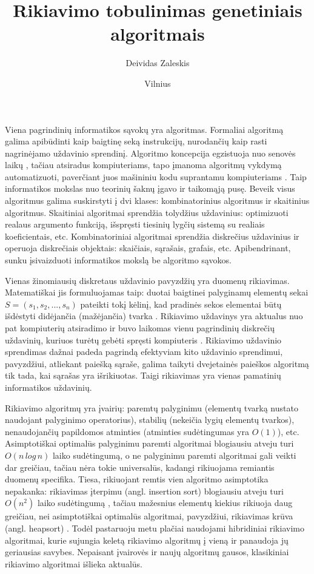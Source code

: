\documentclass{VUMIFInfKursinis}
\institute{Informatikos institutas}  %
\title{Rikiavimo tobulinimas genetiniais algoritmais}
\author{Deividas Zaleskis}
\date{Vilnius \\ \the\year}
\begin{document}
\maketitle

\tableofcontents


Viena pagrindinių informatikos sąvokų yra algoritmas.
Formaliai algoritmą galima apibūdinti kaip
baigtinę seką instrukcijų, nurodančių kaip rasti nagrinėjamo uždavinio sprendinį.
Algoritmo koncepcija egzistuoja nuo senovės laikų \cite{knuth1972ancient}, tačiau atsiradus kompiuteriams,
tapo įmanoma algoritmų vykdymą automatizuoti, paverčiant juos mašininiu kodu suprantamu kompiuteriams \cite{wilkes1951preparation}.
Taip informatikos mokslas nuo teorinių šaknų \cite{turing1937computable} įgavo ir taikomąją pusę.
Beveik visus algoritmus galima suskirstyti į dvi klases: kombinatorinius algoritmus ir skaitinius algoritmus.
Skaitiniai algoritmai sprendžia tolydžius uždavinius: optimizuoti realaus argumento funkciją, išspręsti tiesinių lygčių sistemą su realiais koeficientais, etc.
Kombinatoriniai algoritmai sprendžia diskrečius uždavinius ir operuoja diskrečiais objektais: skaičiais, sąrašais, grafais, etc.
Apibendrinant, sunku įsivaizduoti informatikos mokslą be algoritmo sąvokos.

Vienas žinomiausių diskretaus uždavinio pavyzdžių yra duomenų rikiavimas.
Matematiškai jis formuluojamas taip:
duotai baigtinei palyginamų elementų sekai $S = (s_1, s_2, ..., s_n)$ pateikti tokį
kėlinį, kad pradinės sekos elementai būtų išdėstyti didėjančia (mažėjančia) tvarka \cite{Radavičius_Baranauskas_2013}.
Rikiavimo uždavinys yra aktualus nuo pat kompiuterių atsiradimo ir buvo laikomas vienu 
pagrindinių diskrečių uždavinių, kuriuos turėtų gebėti spręsti kompiuteris \cite{10.1145/356580.356581}.
Rikiavimo uždavinio sprendimas dažnai padeda pagrindą efektyviam kito uždavinio sprendimui,
pavyzdžiui, atliekant paiešką sąraše, galima taikyti dvejetainės paieškos algoritmą tik tada,
kai sąrašas yra išrikiuotas.
Taigi rikiavimas yra vienas pamatinių informatikos uždavinių.

Rikiavimo algoritmų yra įvairių:
paremtų palyginimu (elementų tvarką nustato naudojant palyginimo operatorius),
stabilių (nekeičia lygių elementų tvarkos),
nenaudojančių papildomos atminties (atminties sudėtingumas yra $O(1)$), etc.
Asimptotiškai optimalūs palyginimu paremti algoritmai blogiausiu atveju turi $O(n\,log\,n)$ laiko sudėtingumą,
o ne palyginimu paremti algoritmai gali veikti dar greičiau, tačiau nėra tokie universalūs, kadangi rikiuojama remiantis duomenų specifika.
Tiesa, rikiuojant remtis vien algoritmo asimptotika nepakanka:
rikiavimas įterpimu (angl. insertion sort) blogiausiu atveju turi $O(n^2)$ laiko sudėtingumą \cite{bender2006insertion},
tačiau mažesnius elementų kiekius rikiuoja daug greičiau, nei asimptotiškai optimalūs algoritmai,
pavyzdžiui, rikiavimas krūva (angl. heapsort) \cite{10.1145/512274.512284}.
Todėl pastaruoju metu plačiai naudojami hibridiniai rikiavimo algoritmai, kurie sujungia keletą rikiavimo
algoritmų į vieną ir panaudoja jų geriausias savybes.
Nepaisant įvairovės ir naujų algoritmų gausos, klasikiniai rikiavimo algoritmai išlieka aktualūs.
\end{document}
